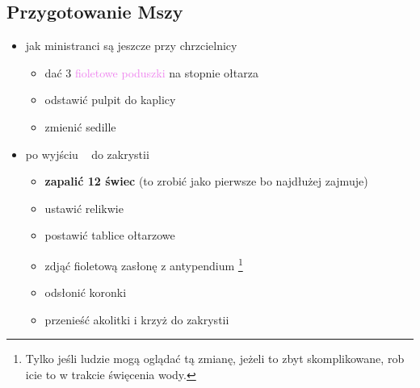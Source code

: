 \subsection{Przygotowanie Mszy}
\begin{itemize}
	\item jak ministranci są jeszcze przy chrzcielnicy
	      \begin{itemize}
		      \item dać 3 \textcolor{violet}{fioletowe poduszki} na stopnie
		            ołtarza
		      \item odstawić pulpit do kaplicy
		      \item zmienić sedille
	      \end{itemize}
	\item po wyjściu \ii~ do zakrystii
	      \begin{itemize}
		      \item \textbf{zapalić 12 świec} (to zrobić jako pierwsze bo
		            najdłużej zajmuje)
		      \item ustawić relikwie
		      \item postawić tablice ołtarzowe
		      \item zdjąć {\color{violet} fioletową} zasłonę z antypendium
		            \footnote{Tylko jeśli ludzie mogą oglądać tą zmianę, jeżeli
			            to zbyt skomplikowane, rob icie to w trakcie święcenia
			            wody.}
		      \item odsłonić koronki
		      \item przenieść akolitki i krzyż do zakrystii
	      \end{itemize}
\end{itemize}

